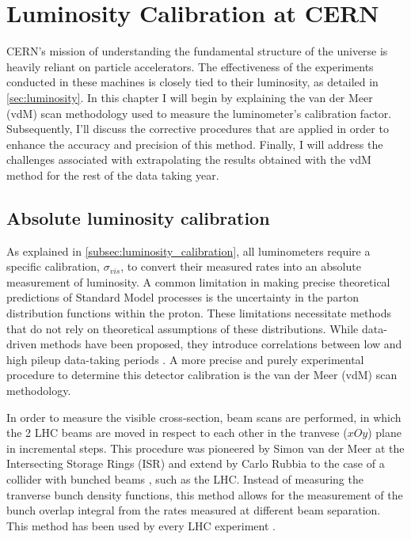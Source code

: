 \chapter{Luminosity Calibration at CERN}

CERN’s mission of understanding the fundamental structure of the universe is heavily reliant on particle accelerators. The effectiveness of the experiments conducted in these machines is closely tied to their luminosity, as detailed in \autoref{sec:luminosity}. In this chapter I will begin by explaining the van der Meer (vdM) scan methodology used to measure the luminometer's calibration factor. Subsequently, I'll discuss the corrective procedures that are applied in order to enhance the accuracy and precision of this method. Finally, I will address the challenges associated with extrapolating the results obtained with the vdM method for the rest of the data taking year.

\section{Absolute luminosity calibration}
\label{sec:absolute_luminosity_calibration}

As explained in \autoref{subsec:luminosity_calibration}, all luminometers require a specific calibration, $\sigma_{vis}$, to convert their measured rates into an absolute measurement of luminosity. A common limitation in making precise theoretical predictions of Standard Model processes is the uncertainty in the parton distribution functions within the proton. These limitations necessitate methods that do not rely on theoretical assumptions of these distributions. While data-driven methods have been proposed, they introduce correlations between low and high pileup data-taking periods \cite{Salfeld-Nebgen_2018}. A more precise and purely experimental procedure to determine this detector calibration is the van der Meer (vdM) scan methodology.

In order to measure the visible cross-section, beam scans are performed, in which the 2 LHC beams are moved in respect to each other in the tranvese ($xOy$) plane in incremental steps. This procedure was pioneered by Simon van der Meer at the Intersecting Storage Rings (ISR) \cite{vanderMeer:296752} and extend by Carlo Rubbia to the case of a collider with bunched beams \cite{Rubbia:1025746}, such as the LHC. Instead of measuring the tranverse bunch density functions, this method allows for the measurement of the bunch overlap integral from the rates measured at different beam separation. This method has been used by every LHC experiment \cite{TheLHCbcollaboration_2014, ALICE-PUBLIC-2021-001, Maettig:1513982, Sirunyan:2759951}.

